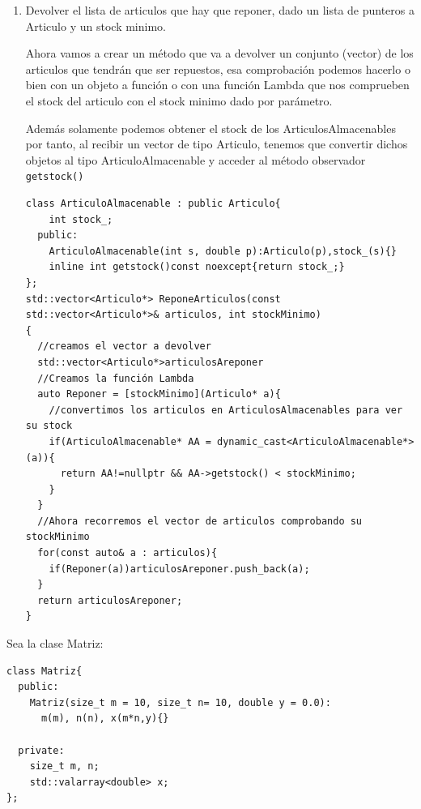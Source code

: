 \begin{enumerate}
  \item Devolver el lista de articulos que hay que reponer, dado un lista de punteros a Articulo y un stock minimo.

  Ahora vamos a crear un método que va a devolver un conjunto (vector) de los articulos que tendrán que ser repuestos, esa comprobación podemos hacerlo o bien con un objeto a función o con una función Lambda que nos comprueben el stock del articulo con el stock minimo dado por parámetro.

  Además solamente podemos obtener el stock de los ArticulosAlmacenables por tanto, al recibir un vector de tipo Articulo, tenemos que convertir dichos objetos al tipo ArticuloAlmacenable y acceder al método observador \texttt{getstock()}

\begin{verbatim}
class ArticuloAlmacenable : public Articulo{
    int stock_;
  public:
    ArticuloAlmacenable(int s, double p):Articulo(p),stock_(s){}
    inline int getstock()const noexcept{return stock_;}
};
std::vector<Articulo*> ReponeArticulos(const std::vector<Articulo*>& articulos, int stockMinimo)
{
  //creamos el vector a devolver
  std::vector<Articulo*>articulosAreponer
  //Creamos la función Lambda
  auto Reponer = [stockMinimo](Articulo* a){
    //convertimos los articulos en ArticulosAlmacenables para ver su stock
    if(ArticuloAlmacenable* AA = dynamic_cast<ArticuloAlmacenable*>(a)){
      return AA!=nullptr && AA->getstock() < stockMinimo;
    }
  }
  //Ahora recorremos el vector de articulos comprobando su stockMinimo
  for(const auto& a : articulos){
    if(Reponer(a))articulosAreponer.push_back(a);
  }
  return articulosAreponer;
}
\end{verbatim}
\end{enumerate}
\newpage
{} Sea la clase Matriz:
\begin{center}
  \begin{lstlisting}[frame = single]
class Matriz{
  public:
    Matriz(size_t m = 10, size_t n= 10, double y = 0.0): 
      m(m), n(n), x(m*n,y){}

  private:
    size_t m, n;
    std::valarray<double> x;
};
  \end{lstlisting}
\end{center}

